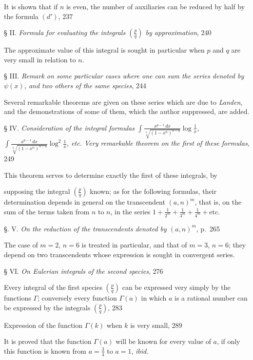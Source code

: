 \documentclass{article}
\begin{document}
It is shown that if $n$ is even, the number of auxiliaries can be reduced by half by the formula $(d')$, 237

§ II. \emph{Formula for evaluating the integrals $\left(\frac{p}{q}\right)$ by approximation}, 240

The approximate value of this integral is sought in particular when $p$ and $q$ are very small in relation to $n$.

§ III. \emph{Remark on some particular cases where one can sum the series denoted by $\psi(x)$, and two others of the same species}, 244

Several remarkable theorems are given on these series which are due to \emph{Landen}, and the demonstrations of some of them, which the author suppressed, are added.

§ IV. \emph{Consideration of the integral formulas $\displaystyle\int\frac{x^{p-1}\,dx}{\sqrt[n]{(1-x^{n})^{n-q}}}\log\frac{1}{x}$, $\displaystyle\int\frac{x^{p-1}\,dx}{\sqrt[n]{(1-x^{n})^{n-q}}}\log^{2}\frac{1}{x}$, etc. Very remarkable theorem on the first of these formulas}, 249

This theorem serves to determine exactly the first of these integrals, by

supposing the integral $\left(\frac{p}{q}\right)$ known; as for the following formulas, their determination depends in general on the transcendent $(a,n)^{m}$, that is, on the sum of the terms taken from $n$ to $n$, in the series $1+\frac{1}{2^{m}}+\frac{1}{3^{m}}+\frac{1}{4^{m}}+\text{etc.}$

§. V. \emph{On the reduction of the transcendents denoted by $(a,n)^{m}$}, p.~265

The case of $m=2$, $n=6$ is treated in particular, and that of $m=3$, $n=6$; they depend on two transcendents whose expression is sought in convergent series.

§ VI. \emph{On Eulerian integrals of the second species}, 276

Every integral of the first species $\left(\frac{p}{q}\right)$ can be expressed very simply by the functions $\Gamma$; conversely every function $\Gamma(a)$ in which $a$ is a rational number can be expressed by the integrals $\left(\frac{p}{q}\right)$, 283

Expression of the function $\Gamma(k)$ when $k$ is very small, 289

It is proved that the function $\Gamma(a)$ will be known for every value of $a$, if only this function is known from $a=\frac{3}{4}$ to $a=1$, \emph{ibid.}
\end{document}
